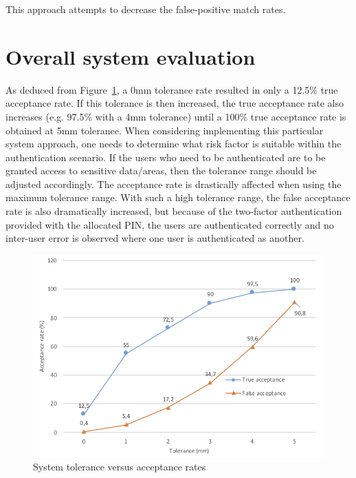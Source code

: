This approach attempts to decrease the false-positive match rates. 


\section{Overall system evaluation}

As deduced from Figure~\ref{fig:System tolerance versus acceptance rates}, a 0mm tolerance rate resulted in only a 12.5\% true acceptance rate. If this tolerance is then increased, the true acceptance rate also increases (e.g. 97.5\% with a 4mm tolerance) until a 100\% true acceptance rate is obtained at 5mm tolerance. 
When considering implementing this particular system approach, one needs to determine what risk factor is suitable within the authentication scenario. If the users who need to be authenticated are to be granted access to sensitive data/areas, then the tolerance range should be adjusted accordingly. The acceptance rate is drastically affected when using the maximum tolerance range. With such a high tolerance range, the false acceptance rate is also dramatically increased, but because of the two-factor authentication provided with the allocated PIN, the users are authenticated correctly and no inter-user error is observed where one user is authenticated as another.

    
    \begin{figure}[htbp!] 
    \centering    
    \includegraphics[width=1.0\textwidth]{Chapter4/Figs/Tolerance.png}
    \caption[System tolerance versus acceptance rates]{System tolerance versus acceptance rates}
    \label{fig:System tolerance versus acceptance rates}
    \end{figure}


